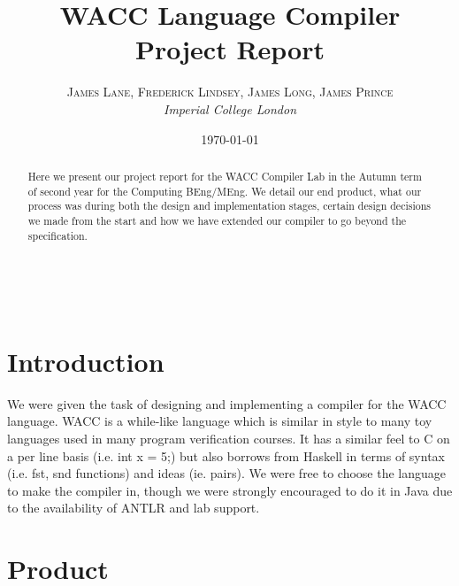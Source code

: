 \documentclass[a4paper, 11pt]{article} %
\title{\textbf{WACC Language Compiler} \\ Project Report} %
\author{\textsc{James Lane, Frederick Lindsey, James Long, James Prince} %
\\{\textit{Imperial College London}}} %
\date{\today} %
\makeatletter
\renewcommand{\maketitle}{ %
\begin{flushleft} %
{\LARGE\@title} %

\vspace{30pt} %

{\large\@author} %
\\\@date %

\vspace{30pt} %
\end{flushleft}
}
\makeatother
\begin{document}
\maketitle %



\begin{abstract}
Here we present our project report for the WACC Compiler Lab in the Autumn term of second year for the Computing BEng/MEng. We detail our end product, what our process was during both the design and implementation stages, certain design decisions we made from the start and how we have extended our compiler to go beyond the specification.
\end{abstract}


\vspace{20pt} %


\section*{Introduction}

We were given the task of designing and implementing a compiler for the WACC language. WACC is a while-like language which is similar in style to many toy languages used in many program verification courses. It has a similar feel to C on a per line basis (i.e. int x = 5;) but also borrows from Haskell in terms of syntax (i.e. fst, snd functions) and ideas (ie. pairs). We were free to choose the language to make the compiler in, though we were strongly encouraged to do it in Java due to the availability of ANTLR and lab support.


\section*{Product}
\end{document}
